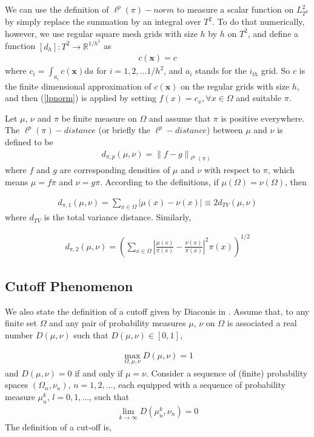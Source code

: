 \documentclass{article}
\begin{document}
We can use the definition of $\ell^p(\pi)-norm$ to measure a scalar function on $L^{2}_{T^2}$ by simply replace the summation by an integral over $T^2$. To do that numerically, however, we use regular square mesh grids with size $h$ by $h$ on $T^2$, and define a function $[d_h]: T^2 \rightarrow \mathbb{R}^{1/h^2}$ as
\begin{eqnarray}
[d_h]c(\mathbf{x}) = c
\end{eqnarray}
where $c_i = \int_{a_i} c(\mathbf{x}) \text{d}a$ for $i = 1,2,...1/h^2$, and $a_i$ stands for the $i_{th}$ grid. So $c$ is the finite dimensional approximation of $c(\mathbf{x})$ on the regular grids with size $h$, and then (\ref{lpnorm}) is applied by setting $f(x) = c_x, \forall x \in \Omega $ and suitable $\pi$.


Let $\mu$, $\nu$ and $\pi$ be finite measure on $\Omega$ and assume that $\pi$ is positive everywhere. The $\ell^p(\pi)-distance$ (or briefly the $\ell^p-distance$) between $\mu$ and $\nu$ is defined to be 
\begin{eqnarray}
 d_{\pi,p}(\mu,\nu) = \| f-g \|_{\ell^p(\pi)} 
\end{eqnarray}
where $f$ and $g$ are corresponding densities of $\mu$ and $\nu$ with respect to $\pi$, which means $\mu = f\pi$ and $\nu = g\pi$. According to the definitions, if $\mu(\Omega) = \nu(\Omega)$, then

\begin{eqnarray}
 d_{\pi,1}(\mu,\nu)=\sum_{x \in \Omega}|\mu(x)-\nu(x)| \equiv  2  d_{TV}(\mu,\nu)
\end{eqnarray}  
where $d_{TV}$ is the total variance distance. Similarly, 

\begin{eqnarray}
\label{L2distance}
 d_{\pi,2}(\mu,\nu) = \left(  \sum_{x \in \Omega} \left| \frac{\mu(x)}{\pi(x)}-\frac{\nu(x)}{\pi(x)} \right|^2 \pi(x) \right)^{1/2}
\end{eqnarray}




\subsection{Cutoff Phenomenon}
We also state the definition of a cutoff given by Diaconis in
\cite{Diaconis2005}. Assume that, to any finite set $\Omega$ and any
pair of probability measures $\mu$, $\nu$ on $\Omega$ is associated
a real number $D(\mu,\nu)$ such that $D(\mu,\nu)\in [0,1]$,

\begin{eqnarray}
\max_{\Omega,\mu,\nu} D(\mu,\nu) = 1
\end{eqnarray}
and $D(\mu,\nu)=0$ if and only if $\mu=\nu$. Consider a sequence of
(finite) probability spaces $(\Omega_n,\nu_n)$, $n=1,2,...$, each
equipped with a sequence of probability measure $\mu^k_n$,
$l=0,1,...$, such that
\begin{eqnarray}
\lim_{k \rightarrow \infty} D(\mu^k_n,\nu_n)=0
\end{eqnarray}
The definition of a cut-off is,
\end{document}
